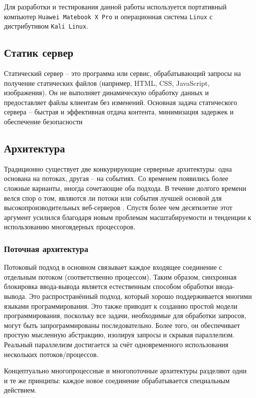 Для разработки и тестирования данной работы используется портативный компьютер \texttt{Huawei Matebook X Pro} и операционная система \texttt{Linux} с дистрибутивом \texttt{Kali Linux}.

\subsection{Статик сервер}

Статический сервер -- это программа или сервис, обрабатывающий запросы на получение статических файлов (например, HTML, CSS, JavaScript, изображения). Он не выполняет динамическую обработку данных и предоставляет файлы клиентам без изменений. Основная задача статического сервера -- быстрая и эффективная отдача контента, минимизация задержек и обеспечение безопасности

\subsection{Архитектура}

Традиционно существует две конкурирующие серверные архитектуры: одна основана на потоках, другая -- на событиях. Со временем появились более сложные варианты, иногда сочетающие оба подхода. В течение долгого времени велся спор о том, являются ли потоки или события лучшей основой для высокопроизводительных веб-серверов \cite{monadic}. Спустя более чем десятилетие этот аргумент усилился благодаря новым проблемам масштабируемости и тенденции к использованию многоядерных процессоров.

\subsubsection{Поточная архитектура}

Потоковый подход в основном связывает каждое входящее соединение с отдельным потоком (соответственно процессом). Таким образом, синхронная блокировка ввода-вывода является естественным способом обработки ввода-вывода. Это распространённый подход, который хорошо поддерживается многими языками программирования. Это также приводит к созданию простой модели программирования, поскольку все задачи, необходимые для обработки запросов, могут быть запрограммированы последовательно. Более того, он обеспечивает простую мысленную абстракцию, изолируя запросы и скрывая параллелизм. Реальный параллелизм достигается за счёт одновременного использования нескольких потоков/процессов.

Концептуально многопроцессные и многопоточные архитектуры разделяют одни и те же принципы: каждое новое соединение обрабатывается специальным действием.

